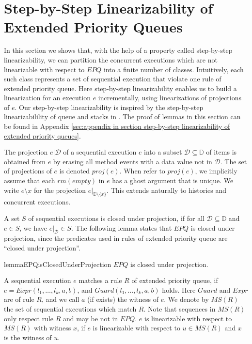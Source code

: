 \section{Step-by-Step Linearizability of Extended Priority Queues}
\label{sec:step-by-step linearizability of extended priority queues}

In this section we shows that, with the help of a property called step-by-step linearizability, we can partition the concurrent executions which are not linearizable with respect to $\textit{EPQ}$ into a finite number of classes. Intuitively, each such class represents a set of sequential execution that violate one rule of extended priority queue. Here step-by-step linearizability enables us to build a linearization for an execution $e$ incrementally, using linearizations of projections of $e$. Our step-by-step linearizability is inspired by the step-by-step linearizabilility of queue and stacks in \cite{Bouajjani:2015}. The proof of lemmas in this section can be found in Appendix \ref{sec:appendix in section step-by-step linearizability of extended priority queues}.

The projection $e \vert{\mathcal{D}}$ of a sequential execution $e$ into a subset $\mathcal{D} \subseteq \mathbb{D}$ of items is obtained from $e$ by erasing all method events with a data value not in $\mathcal{D}$. The set of projections of $e$ is denoted $\textit{proj}(e)$. When refer to $\textit{proj}(e)$, we implicitly assume that each $\textit{rm}(\textit{empty})$ in $e$ has a ghost argument that is unique. We write $e \setminus x$ for the projection $e \vert_{ \mathbb{D} \setminus \{ x \} }$. This extends naturally to histories and concurrent executions.

A set $S$ of sequential executions is closed under projection, if for all $\mathcal{D} \subseteq \mathbb{D}$ and $e \in S$, we have $e \vert_{ \mathcal{D} } \in S$. The following lemma states that $\textit{EPQ}$ is closed under projection, since the predicates used in rules of extended priority queue are ``closed under projection''.

\begin{restatable}{lemma}{EPQisClosedUnderProjection}
\label{lemma:EPQ is closed under projection}
$\textit{EPQ}$ is closed under projection.
\end{restatable}

A sequential execution $e$ matches a rule $R$ of extended priority queue, if $e=\textit{Expr}(l_1, \ldots, l_k,a,b)$, and $\textit{Guard}(l_1, \ldots, l_k,a,b)$ holds. Here $\textit{Guard}$ and $\textit{Expr}$ are of rule $R$, and we call $a$ (if exists) the witness of $e$. We denote by $\textit{MS}(R)$ the set of sequential executions which match $R$. Note that sequences in $\textit{MS}(R)$ only respect rule $R$ and may be not in $\textit{EPQ}$. $e$ is linearizable with respect to $\textit{MS}(R)$ with witness $x$, if $e$ is linearizable with respect to $u \in \textit{MS}(R)$ and $x$ is the witness of $u$.

